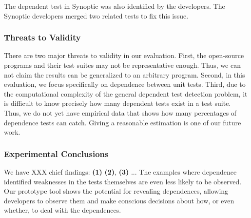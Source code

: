The dependent test in Synoptic was also identified
by the developers. The Synoptic developers merged
two related tests to fix this issue.


\subsubsection{Threats to Validity}

There are two major threats to validity in our evaluation.
First, the  open-source
programs and their test suites may not be
representative enough. Thus, we can not claim the results
can be generalized to an arbitrary program.
Second, in this evaluation, we focus specifically on
dependence between unit tests.
Third, due to the computational complexity of the general dependent test
detection problem, it is difficult to know precisely how many dependent
tests exist in a test suite. Thus, we do not
yet have empirical data that shows how many percentages of dependence tests
\ourtool can catch.  Giving a reasonable estimation is one of our future work.

\subsubsection{Experimental Conclusions}


We have XXX chief findings: \textbf{(1)}
\textbf{(2)}, \textbf{(3)} ...
The examples where dependence identified weaknesses in the tests themselves
are even less likely to be observed.  
Our prototype tool shows
the potential for revealing dependences, allowing
developers to observe them and make conscious decisions about how, or even whether,
to deal with the dependences. 
